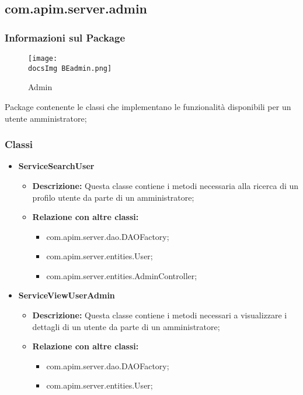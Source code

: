 {{     \subsection{com.apim.server.admin}{
    \subsubsection{Informazioni sul Package}
        \begin{figure}[H]
          \centering
         \texttt{[image: \\docsImg BEadmin.png]}
          \caption{Admin}
          \label{Admin}
        \end{figure}
        Package  contenente le classi che implementano le funzionalità disponibili per un utente amministratore;
        \subsubsection{Classi}
        \begin{itemize} \itemsep1pt
          \item \textbf{ServiceSearchUser}
          \begin{itemize}
            \item \textbf{Descrizione:} Questa classe contiene i metodi necessaria alla ricerca di un profilo utente da parte di un amministratore;
            \item \textbf{Relazione con altre classi:}
            \begin{itemize}
              \item com.apim.server.dao.DAOFactory;
              \item com.apim.server.entities.User;
              \item com.apim.server.entities.AdminController;
            \end{itemize}
          \end{itemize}
          \item \textbf{ServiceViewUserAdmin}
          \begin{itemize}
            \item \textbf{Descrizione:} Questa classe contiene i metodi necessari a visualizzare i dettagli di un utente da parte di un amministratore;
            \item \textbf{Relazione con altre classi:}
            \begin{itemize}
              \item com.apim.server.dao.DAOFactory;
              \item com.apim.server.entities.User;

\end{itemize}
\end{itemize}
\end{itemize}}}}
